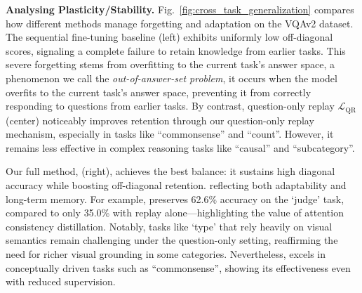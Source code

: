 \begin{table}[t]
    \centering
    \caption{Comparison of attention distillation methods.}
    \vspace{-3mm}
    \renewcommand{\arraystretch}{1.2}
    \setlength{\tabcolsep}{8pt}
    \vspace{-3mm}
    \label{tab:attn_distillation}
\end{table}

\noindent {} \textbf{Analysing Plasticity/Stability. }Fig.~\ref{fig:cross_task_generalization} compares how different methods manage forgetting and adaptation on the VQAv2 dataset. The sequential fine-tuning baseline (left) exhibits uniformly low off-diagonal scores, signaling a complete failure to retain knowledge from earlier tasks. This severe forgetting stems from overfitting to the current task’s answer space, a phenomenon we call the \textit{out-of-answer-set problem}, it occurs when the model overfits to the current task’s answer space, preventing it from correctly responding to questions from earlier tasks. By contrast, question-only replay $\mathcal{L}_{\text{QR}}$ (center) noticeably improves retention through our question-only replay mechanism, especially in tasks like ``commonsense'' and ``count''. However, it remains less effective in complex reasoning tasks like ``causal'' and ``subcategory''. 

Our full method, \qstmethodshort{} (right), achieves the best balance: it sustains high diagonal accuracy while boosting off-diagonal retention. reflecting both adaptability and long-term memory. For example, \qstmethodshort{} preserves 62.6\% accuracy on the `judge' task, compared to only 35.0\% with replay alone—highlighting the value of attention consistency distillation. Notably, tasks like `type' that rely heavily on visual semantics remain challenging under the question-only setting, reaffirming the need for richer visual grounding in some categories. Nevertheless, \qstmethodshort{} excels in conceptually driven tasks such as ``commonsense'', showing its effectiveness even with reduced supervision.

